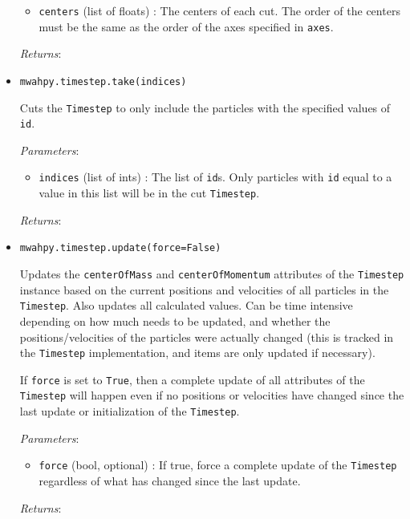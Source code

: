 \documentclass{article}
\begin{document}
\begin{itemize}
\begin{itemize}
\item \verb!centers! (list of floats) : The centers of each cut. The order of the centers must be the same as the order of the axes specified in \verb!axes!.

\end{itemize}

\textit{Returns}: 



\item \verb!mwahpy.timestep.take(indices)!

Cuts the \verb!Timestep! to only include the particles with the specified values of \verb!id!.

\textit{Parameters}: \begin{itemize}

\item \verb!indices! (list of ints) : The list of \verb!id!s. Only particles with \verb!id! equal to a value in this list will be in the cut \verb!Timestep!.

\end{itemize}

\textit{Returns}: 



\item \verb!mwahpy.timestep.update(force=False)!

Updates the \verb!centerOfMass! and \verb!centerOfMomentum! attributes of the \verb!Timestep! instance based on the current positions and velocities of all particles in the \verb!Timestep!. Also updates all calculated values. Can be time intensive depending on how much needs to be updated, and whether the positions/velocities of the particles were actually changed (this is tracked in the \verb!Timestep! implementation, and items are only updated if necessary).

If \verb!force! is set to \verb!True!, then a complete update of all attributes of the \verb!Timestep! will happen even if no positions or velocities have changed since the last update or initialization of the \verb!Timestep!.

\textit{Parameters}: \begin{itemize}

\item \verb!force! (bool, optional) : If true, force a complete update of the \verb!Timestep! regardless of what has changed since the last update.

\end{itemize}

\textit{Returns}:



\end{itemize}
\end{document}
